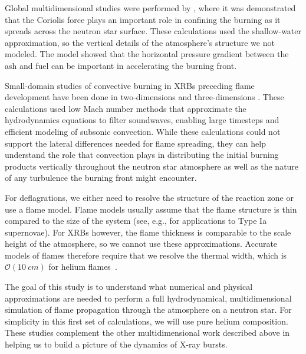 \documentclass[preprint,times,tighten]{aastex63}
\newcommand{\MarginPar}[1]{
    \marginpar{\vskip-\baselineskip%
               \raggedright%
               \tiny\sffamily%
               {\color{red}\hrule%
               \smallskip%
               #1\par%
               \smallskip%
               \hrule}}%
}
\begin{document}
Global multidimensional studies were performed by
\citet{spitkovsky2002}, where it was demonstrated that the Coriolis
force plays an important role in confining the burning as it spreads
across the neutron star surface.  These calculations used the
shallow-water approximation, so the vertical details of the
atmosphere's structure we not modeled.  The model showed that the
horizontal pressure gradient between the ash and fuel can be important
in accelerating the burning front.

Small-domain studies of convective burning in XRBs preceding flame
development have been done in two-dimensions \citep{lin:2006,xrb,xrb2}
and three-dimensions \citep{xrb3d}.  These calculations used low Mach
number methods that approximate the hydrodynamics equations to filter
soundwaves, enabling large timesteps and efficient modeling of
subsonic convection.  While these calculations could not support
the lateral differences needed for flame spreading, they can help
understand the role that convection plays in distributing the initial
burning products vertically throughout the neutron star atmosphere as well
as the nature of any turbulence the burning front might encounter.



\cite{cavecchi:2013,art-2015-cavecchi-etal,art-2016-cavecchi-etal} \MarginPar{need a summary}

For deflagrations, we either need to resolve the structure of the
reaction zone or use a flame model.  Flame models usually assume that
the flame structure is thin compared to the size of the system (see,
e.g., \citet{Ropke2007} for applications to Type Ia supernovae).  For
XRBs however, the flame thickness is comparable to the scale height of
the atmosphere, so we cannot use these approximations.  Accurate
models of flames therefore require that we resolve the thermal width,
which is $\mathcal{O}(10~cm)$ for helium flames~\citep{Timmes00}.

The goal of this study is to understand what numerical and physical
approximations are needed to perform a full hydrodynamical,
multidimensional simulation of flame propagation through the
atmosphere on a neutron star.  For simplicity in this first set of
calculations, we will use pure helium composition.  These studies
complement the other multidimensional work described above in helping
us to build a picture of the dynamics of X-ray bursts.


\end{document}

